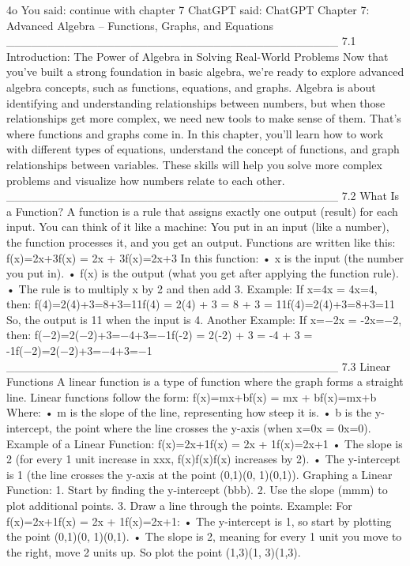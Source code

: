 4o
You said:
continue with chapter 7
ChatGPT said:
ChatGPT
Chapter 7: Advanced Algebra – Functions, Graphs, and Equations
________________________________________
7.1 Introduction: The Power of Algebra in Solving Real-World Problems
Now that you’ve built a strong foundation in basic algebra, we’re ready to explore advanced algebra concepts, such as functions, equations, and graphs. Algebra is about identifying and understanding relationships between numbers, but when those relationships get more complex, we need new tools to make sense of them. That’s where functions and graphs come in.
In this chapter, you’ll learn how to work with different types of equations, understand the concept of functions, and graph relationships between variables. These skills will help you solve more complex problems and visualize how numbers relate to each other.
________________________________________
7.2 What Is a Function?
A function is a rule that assigns exactly one output (result) for each input. You can think of it like a machine: You put in an input (like a number), the function processes it, and you get an output.
Functions are written like this:
f(x)=2x+3f(x) = 2x + 3f(x)=2x+3
In this function:
•	x is the input (the number you put in).
•	f(x) is the output (what you get after applying the function rule).
•	The rule is to multiply x by 2 and then add 3.
Example: If x=4x = 4x=4, then:
f(4)=2(4)+3=8+3=11f(4) = 2(4) + 3 = 8 + 3 = 11f(4)=2(4)+3=8+3=11
So, the output is 11 when the input is 4.
Another Example: If x=−2x = -2x=−2, then:
f(−2)=2(−2)+3=−4+3=−1f(-2) = 2(-2) + 3 = -4 + 3 = -1f(−2)=2(−2)+3=−4+3=−1
________________________________________
7.3 Linear Functions
A linear function is a type of function where the graph forms a straight line. Linear functions follow the form:
f(x)=mx+bf(x) = mx + bf(x)=mx+b
Where:
•	m is the slope of the line, representing how steep it is.
•	b is the y-intercept, the point where the line crosses the y-axis (when x=0x = 0x=0).
Example of a Linear Function:
f(x)=2x+1f(x) = 2x + 1f(x)=2x+1
•	The slope is 2 (for every 1 unit increase in xxx, f(x)f(x)f(x) increases by 2).
•	The y-intercept is 1 (the line crosses the y-axis at the point (0,1)(0, 1)(0,1)).
Graphing a Linear Function:
1.	Start by finding the y-intercept (bbb).
2.	Use the slope (mmm) to plot additional points.
3.	Draw a line through the points.
Example: For f(x)=2x+1f(x) = 2x + 1f(x)=2x+1:
•	The y-intercept is 1, so start by plotting the point (0,1)(0, 1)(0,1).
•	The slope is 2, meaning for every 1 unit you move to the right, move 2 units up. So plot the point (1,3)(1, 3)(1,3).
